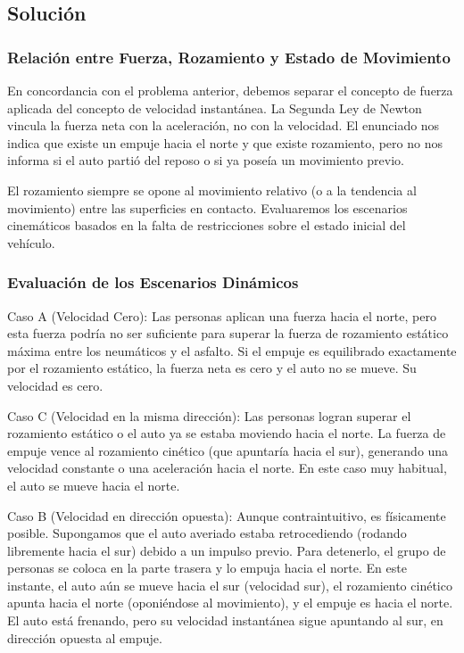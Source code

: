 \documentclass[12pt, a4paper]{article}
\begin{document}
\subsection*{Solución}

\subsubsection*{Relación entre Fuerza, Rozamiento y Estado de Movimiento}

En concordancia con el problema anterior, debemos separar el concepto de fuerza aplicada del concepto de velocidad instantánea. La Segunda Ley de Newton vincula la fuerza neta con la aceleración, no con la velocidad. El enunciado nos indica que existe un empuje hacia el norte y que existe rozamiento, pero no nos informa si el auto partió del reposo o si ya poseía un movimiento previo. 

El rozamiento siempre se opone al movimiento relativo (o a la tendencia al movimiento) entre las superficies en contacto. Evaluaremos los escenarios cinemáticos basados en la falta de restricciones sobre el estado inicial del vehículo.

\subsubsection*{Evaluación de los Escenarios Dinámicos}

Caso A (Velocidad Cero): Las personas aplican una fuerza hacia el norte, pero esta fuerza podría no ser suficiente para superar la fuerza de rozamiento estático máxima entre los neumáticos y el asfalto. Si el empuje es equilibrado exactamente por el rozamiento estático, la fuerza neta es cero y el auto no se mueve. Su velocidad es cero.

Caso C (Velocidad en la misma dirección): Las personas logran superar el rozamiento estático o el auto ya se estaba moviendo hacia el norte. La fuerza de empuje vence al rozamiento cinético (que apuntaría hacia el sur), generando una velocidad constante o una aceleración hacia el norte. En este caso muy habitual, el auto se mueve hacia el norte.

Caso B (Velocidad en dirección opuesta): Aunque contraintuitivo, es físicamente posible. Supongamos que el auto averiado estaba retrocediendo (rodando libremente hacia el sur) debido a un impulso previo. Para detenerlo, el grupo de personas se coloca en la parte trasera y lo empuja hacia el norte. En este instante, el auto aún se mueve hacia el sur (velocidad sur), el rozamiento cinético apunta hacia el norte (oponiéndose al movimiento), y el empuje es hacia el norte. El auto está frenando, pero su velocidad instantánea sigue apuntando al sur, en dirección opuesta al empuje.
\end{document}
